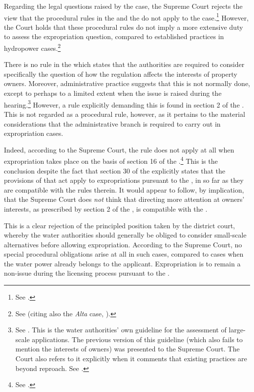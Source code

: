 Regarding the legal questions raised by the case, the Supreme Court rejects the view that the procedural rules in the \cite{ea59} and the \cite{paa67} do not apply to the case.\footnote{See \cite[32-34]{jorpeland11}.} However, the Court holds that these procedural rules do not imply a more extensive duty to assess the expropriation question, compared to established practices in hydropower cases.\footnote{See \cite[51-52]{jorpeland11} (citing also the {\it Alta} case, \cite{alta82}).} 

There is no rule in the \cite{wra17} which states that the authorities are required to consider specifically the question of how the regulation affects the interests of property owners. Moreover, administrative practice suggests that this is not normally done, except to perhaps to a limited extent when the issue is raised during the hearing.\footnote{See \cite{stokker10}. This is the water authorities' own guideline for the assessment of large-scale applications. The previous version of this guideline (which also fails to mention the interests of owners) was presented to the Supreme Court. The Court also refers to it explicitly when it comments that existing practices are beyond reproach. See \cite[51]{jorpeland11}.} However, a rule explicitly demanding this is found in section 2 of the \cite{ea59}. This is not regarded as a procedural rule, however, as it pertains to the material considerations that the administrative branch is required to carry out in expropriation cases. 

Indeed, according to the Supreme Court, the rule does not apply at all when expropriation takes place on the basis of section 16 of the \cite{wra17}.\footnote{See \cite[30]{jorpeland11}.} This is the conclusion despite the fact that section 30 of the \cite{ea59} explicitly states that the provisions of that act apply to expropriations pursuant to the \cite{wra17}, in so far as they are compatible with the rules therein. It would appear to follow, by implication, that the Supreme Court does {\it not} think that directing more attention at owners' interests, as prescribed by section 2 of the \cite{ea59}, is compatible with the \cite{wra17}. 

This is a clear rejection of the principled position taken by the district court, whereby the water authorities should generally be obliged to consider small-scale alternatives before allowing expropriation. According to the Supreme Court, no special procedural obligations arise at all in such cases, compared to cases when the water power already belongs to the applicant. Expropriation is to remain a non-issue during the licensing process pursuant to the \cite{wra17}. 

